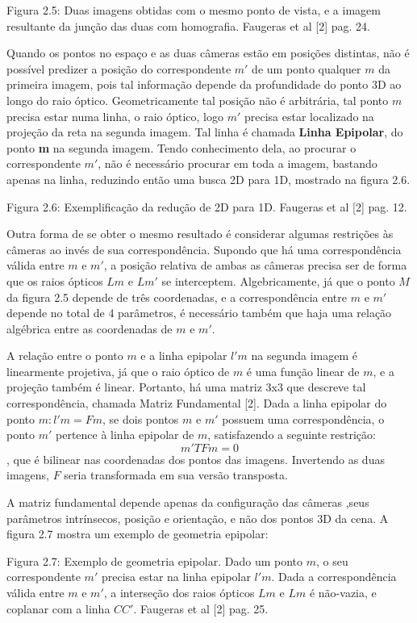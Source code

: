 Figura 2.5: Duas imagens obtidas com o mesmo ponto de vista, e a imagem resultante da junção das duas com homografia. Faugeras et al [2] pag. 24.

Quando os pontos no espaço e as duas câmeras estão em posições distintas, não é possível predizer a posição do correspondente $m'$ de um ponto qualquer $m$ da primeira imagem, pois tal informação depende da profundidade do ponto 3D ao longo do raio óptico. Geometricamente tal posição não é arbitrária, tal ponto $m$ precisa estar numa linha, o raio óptico, logo $m'$ precisa estar localizado na projeção da reta na segunda imagem. Tal linha é chamada \textbf{Linha Epipolar}, do ponto \textbf{m} na segunda imagem. Tendo conhecimento dela, ao procurar o correspondente $m'$, não é necessário procurar em toda a imagem, bastando apenas na linha, reduzindo então uma busca 2D para 1D, mostrado na figura 2.6.


Figura 2.6: Exemplificação da redução de 2D para 1D. Faugeras et al [2] pag. 12.

Outra forma de se obter o mesmo resultado é considerar algumas restrições às câmeras ao invés de sua correspondência. Supondo que há uma correspondência válida entre $m$ e $m'$, a posição relativa de ambas as câmeras precisa ser de forma que os raios ópticos $Lm$ e $Lm'$ se interceptem. Algebricamente, já que o ponto $M$ da figura 2.5 depende de três coordenadas, e a correspondência entre $m$ e $m'$ depende no total de 4 parâmetros, é necessário também que haja uma relação algébrica entre as coordenadas de $m$ e $m'$.

A relação entre o ponto $m$ e a linha epipolar $l'm$ na segunda imagem é linearmente projetiva, já que o raio óptico de $m$ é uma função linear de $m$, e a projeção também é linear. Portanto, há uma matriz 3x3 que descreve tal correspondência, chamada Matriz Fundamental [2]. Dada a linha epipolar do ponto $m: l'm = Fm$, se dois pontos $m$ e $m'$ possuem uma correspondência, o ponto $m'$ pertence à linha epipolar de $m$, satisfazendo a seguinte restrição: 
$$m'TFm = 0$$, que é bilinear nas coordenadas dos pontos das imagens. Invertendo as duas imagens, $F$ seria transformada em sua versão transposta.

A matriz fundamental depende apenas da configuração das câmeras ,seus parâmetros intrínsecos, posição e orientação, e não dos pontos 3D da cena. A figura 2.7 mostra um exemplo de geometria epipolar:

Figura 2.7: Exemplo de geometria epipolar. Dado um ponto $m$, o seu correspondente $m'$ precisa estar na linha epipolar $l'm$. Dada a correspondência válida entre $m$ e $m'$, a interseção dos raios ópticos $Lm$ e $Lm$ é não-vazia, e coplanar com a linha $CC'$. Faugeras et al [2] pag. 25.

